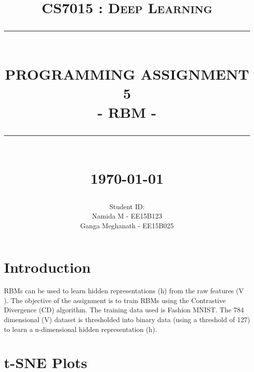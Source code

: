 \documentclass[12pt]{report}
\newcommand{\HRule}[1]{\rule{\linewidth}{#1}}
\begin{document}
\title{ \normalsize \textsc{CS7015 : Deep Learning}
		\\ [2.0cm]
		\HRule{0.5pt} \\
		\LARGE \textbf{\uppercase{Programming Assignment 5}}\\
        \large{- RBM -}
		\HRule{2pt} \\ [0.5cm]
		\normalsize \today \vspace*{5\baselineskip}}

\date{}

\author{
		Student ID:  \\ 
		Namida M - EE15B123 \\
		Ganga Meghanath - EE15B025
		}

\renewcommand\thesection{\arabic{section}}
\maketitle
\tableofcontents
\newpage

\sectionfont{\scshape}


\section{Introduction}
RBMs can be used to learn hidden representations (h) from the raw features (V ). The objective of the assignment is to train RBMs using the Contrastive Divergence (CD) algorithm. The training data used is Fashion MNIST. The 784 dimensional (V) dataset is thresholded into binary data (using a threshold of 127) to learn a n-dimensional hidden representation (h).

\section{t-SNE Plots}
\end{document}

